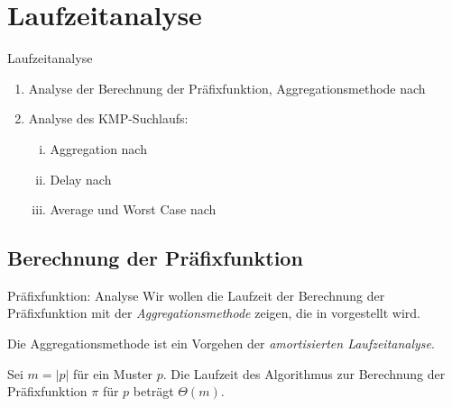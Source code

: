 \documentclass[xcolor=dvipsnames, aspectratio=169]{beamer}
\begin{document}
\section{Laufzeitanalyse}

\begin{frame}{Laufzeitanalyse}

\begin{enumerate}[(1)]
\item Analyse der Berechnung der Präfixfunktion, Aggregationsmethode nach \cite{cormenalgorithms2009}
\item Analyse des KMP-Suchlaufs:

\begin{enumerate}[(i)]
\item Aggregation nach \cite{cormenalgorithms2009}
\item Delay nach \cite{KnuthMorrisPratt1977}
\item Average und Worst Case nach \cite{baeza1989}
\end{enumerate}
\end{enumerate}
\end{frame}

\subsection{Berechnung der Präfixfunktion}


\begin{frame}{Präfixfunktion: Analyse}
Wir wollen die Laufzeit der Berechnung der Präfixfunktion mit der \emph{Aggregationsmethode} zeigen, die in \cite{cormenalgorithms2009} vorgestellt wird.\medskip

Die Aggregationsmethode ist ein Vorgehen der \emph{amortisierten Laufzeitanalyse}.\bigskip\pause

\begin{theo}
Sei $m=\vert p\vert$ für ein Muster $p$. Die Laufzeit des Algorithmus zur Berechnung der Präfixfunktion $\pi$ für $p$ beträgt $\Theta(m)$.
\end{theo}
\end{frame}
\end{document}
